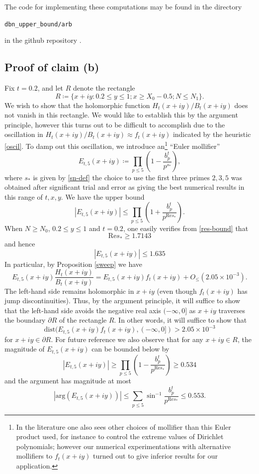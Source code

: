\documentclass[a4paper,11pt,twoside]{amsart}
\begin{document}
The code for implementing these computations may be found in the directory

\centerline{\tt dbn\_upper\_bound/arb}

in the github repository \cite{github}.

\subsection{Proof of claim (b)}\label{b-bound}

Fix $t=0.2$, and let $R$ denote the rectangle
$$ R \coloneqq \{ x+iy: 0.2 \leq y \leq 1; x \geq X_0 - 0.5; N \leq N_1 \}.$$
We wish to show that the holomorphic function $H_t(x+iy)/B_t(x+iy)$ does not vanish in this rectangle.  We would like to establish this by the argument principle, however this turns out to be difficult to accomplish due to the oscillation in $H_t(x+iy)/B_t(x+iy) \approx f_t(x+iy)$ indicated by the heuristic \eqref{oscil}.  To damp out this oscillation, we introduce an\footnote{In the literature one also sees other choices of mollifier than this Euler product used, for instance to control the extreme values of Dirichlet polynomials; however our numerical experimentations with alternative mollifiers to $f_t(x+iy)$ turned out to give inferior results for our application.} ``Euler mollifier''
$$ E_{t,5}(x+iy) \coloneqq \prod_{p \leq 5} \left( 1 - \frac{b_p^t}{p^{s_*}}\right),$$
where $s_*$ is given by \eqref{sn-def} the choice to use the first three primes $2,3,5$ was obtained after significant trial and error as giving the best numerical results in this range of $t,x,y$.  We have the upper bound
$$
|E_{t,5}(x+iy)| \leq \prod_{p \leq 5} \left(1 + \frac{b_p^t}{p^{\mathrm{Re} s_*}} \right).
$$
When $N \geq N_0$, $0.2 \leq y \leq 1$ and $t = 0.2$, one easily verifies from \eqref{res-bound} that
$$ \mathrm{Re} s_* \geq 1.7143 $$
and hence
$$ |E_{t,5}(x+iy)| \leq 1.635 $$ %
In particular, by Proposition \ref{sweep} we have
$$ E_{t,5}(x+iy) \frac{H_t(x+iy)}{B_t(x+iy)} = E_{t,5}(x+iy) f_t(x+iy) + O_{\leq}( 2.05 \times 10^{-3} ).$$  %
The left-hand side remains holomorphic in $x+iy$ (even though $f_t(x+iy)$ has jump discontinuities).  Thus, by the argument principle, it will suffice to show that the left-hand side avoids the negative real axis $(-\infty,0]$ as $x+iy$ traverses the boundary $\partial R$ of the rectangle $R$.  In other words, it will suffice to show that
\begin{equation}\label{star}
 \mathrm{dist}( E_{t,5}(x+iy) f_t(x+iy), (-\infty,0]) > 2.05 \times 10^{-3}
\end{equation}
for $x+iy \in\partial R$.
For future reference we also observe that for any $x+iy \in R$,
the magnitude of $E_{t,5}(x+iy)$ can be bounded below by
\begin{equation}\label{et5-lower}
 |E_{t,5}(x+iy)| \geq \prod_{p \leq 5} \left(1 - \frac{b_p^t}{p^{\mathrm{Re} s_*}} \right) \geq 0.534 
\end{equation} %
and the argument has magnitude at most
\begin{equation}\label{et5-phase}
|\mathrm{arg}(E_{t,5}(x+iy))| \leq \sum_{p \leq 5} \sin^{-1} \frac{b_p^t}{p^{\mathrm{Re} s_*}} \leq 0.553. 
\end{equation} %
\end{document}
